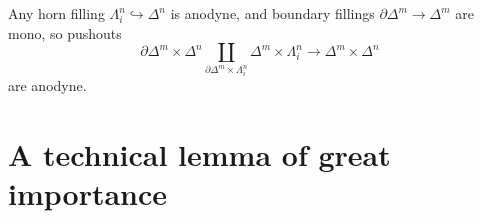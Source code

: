 \documentclass[main.tex]{subfiles}
\begin{document}
\begin{example}
  \label{eg:boundary_filling_times_horn_filling_is_anodyne}
  Any horn filling $\Lambda^{n}_{i} \hookrightarrow \Delta^{n}$ is anodyne, and boundary fillings $\partial \Delta^{m} \to \Delta^{m}$ are mono, so pushouts
  \begin{equation*}
    \partial \Delta^{m} \times \Delta^{n} \coprod_{\partial \Delta^{m} \times \Lambda^{n}_{i}} \Delta^{m} \times \Lambda^{n}_{i} \to \Delta^{m} \times \Delta^{n}
  \end{equation*}
  are anodyne.
\end{example}

\section{A technical lemma of great importance}
\label{sec:a_technical_lemma_of_great_importance}
\end{document}
